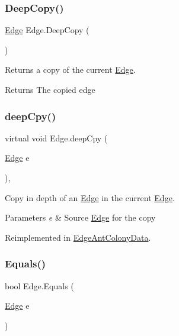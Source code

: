 \subsubsection{\texorpdfstring{Deep\+Copy()}{DeepCopy()}}
{\footnotesize\ttfamily \hyperlink{classEdge}{Edge} Edge.\+Deep\+Copy (\begin{DoxyParamCaption}{ }\end{DoxyParamCaption})\hspace{0.3cm}{\ttfamily [inline]}}



Returns a copy of the current \hyperlink{classEdge}{Edge}. 

\begin{DoxyReturn}{Returns}
The copied edge
\end{DoxyReturn}
\mbox{\label{classEdge_a4257c70fbb9e6c719ea8707a7ad021c5}} 
\subsubsection{\texorpdfstring{deep\+Cpy()}{deepCpy()}}
{\footnotesize\ttfamily virtual void Edge.\+deep\+Cpy (\begin{DoxyParamCaption}\item[{\hyperlink{classEdge}{Edge}}]{e }\end{DoxyParamCaption})\hspace{0.3cm}{\ttfamily [inline]}, {\ttfamily [virtual]}}



Copy in depth of an \hyperlink{classEdge}{Edge} in the current \hyperlink{classEdge}{Edge}. 


\begin{DoxyParams}{Parameters}
{\em e} & Source \hyperlink{classEdge}{Edge} for the copy\\
\hline
\end{DoxyParams}


Reimplemented in \hyperlink{classEdgeAntColonyData_a9debcbebb6da559502b5c4a0a0879983}{Edge\+Ant\+Colony\+Data}.

\mbox{\label{classEdge_a4f8a452073ff0988962014e9037df65d}} 
\subsubsection{\texorpdfstring{Equals()}{Equals()}}
{\footnotesize\ttfamily bool Edge.\+Equals (\begin{DoxyParamCaption}\item[{\hyperlink{classEdge}{Edge}}]{e }\end{DoxyParamCaption})\hspace{0.3cm}{\ttfamily [inline]}}



